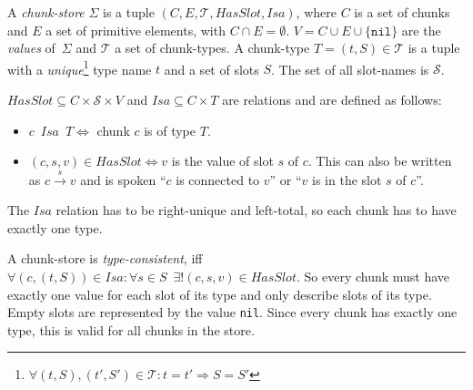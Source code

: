 \begin{definition}
A \emph{chunk-store} $\Sigma$ is a tuple $(C,E,\mathcal{T},HasSlot,Isa)$, where $C$ is a set of chunks and $E$ a set of primitive elements, with $C \cap E = \emptyset$. $V = C \cup E \cup \{ \mathtt{nil} \}$ are the \emph{values} of~$\Sigma$ and $\mathcal{T}$ a set of chunk-types. A chunk-type $T = (t,S) \in \mathcal{T}$ is a tuple with a \emph{unique}\footnote{$\forall (t,S), (t',S') \in \mathcal{T}: t = t' \Rightarrow S = S'$ } type name $t$ and a set of slots $S$. The set of all slot-names is $\mathcal{S}$. 

$HasSlot \subseteq C \times \mathcal{S} \times V$ and $Isa \subseteq C \times T$ are relations and are defined as follows:

\begin{itemize}
 \item $c \enspace Isa \enspace T \Leftrightarrow$ chunk $c$ is of type $T$.
 \item $(c,s,v) \in HasSlot \Leftrightarrow v$ is the value of slot $s$ of $c$. This can also be written as $c \overset{s}{\longrightarrow} v$ and is spoken ``$c$ is connected to $v$'' or ``$v$ is in the slot $s$ of $c$''.
\end{itemize}

The $Isa$ relation has to be right-unique and left-total, so each chunk has to have exactly one type.

% 


A chunk-store is \emph{type-consistent}, iff $\forall (c,(t,S)) \in Isa: \forall s \in S \enspace \exists ! (c,s,v) \in HasSlot$. So every chunk must have exactly one value for each slot of its type and only describe slots of its type. Empty slots are represented by the value \lstinline|nil|. Since every chunk has exactly one type, this is valid for all chunks in the store.


\end{definition}


